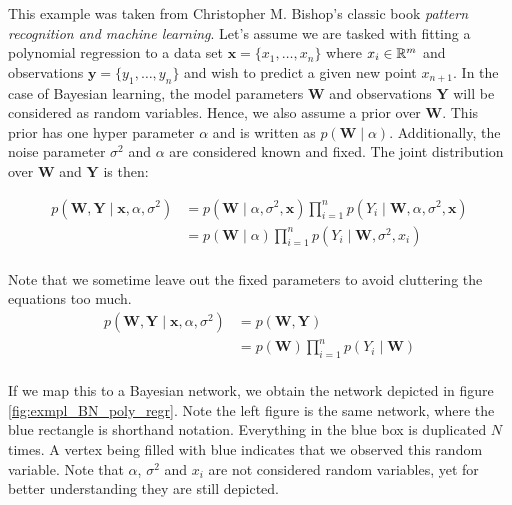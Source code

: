 \begin{exmp}
This example was taken from Christopher M. Bishop's classic book
\textit{pattern recognition and machine learning}. Let's assume
we are tasked with fitting a polynomial regression to a data set 
$\textbf{x} = \{x_1, \dots, x_n\}$ where $x_i \in \mathbb{R}^m$ and 
observations $\textbf{y}=\{y_1, \dots, y_n\}$ and wish to predict 
a given new point $x_{n+1}$.
In the case of Bayesian learning, the model parameters $\textbf{W}$
and observations $\textbf{Y}$ will be considered as random variables.
Hence, we also assume a prior over $\textbf{W}$. This prior has one
hyper parameter $\alpha$ and is written as $p(\textbf{W} \mid \alpha)$.
Additionally, the noise parameter $\sigma^2$ and $\alpha$ are
considered known and fixed. The joint distribution over $\textbf{W}$ 
and $\textbf{Y}$ is then:

\begin{equation}
\begin{split}
p(\textbf{W}, \textbf{Y} \mid \textbf{x}, \alpha, \sigma^2) 
	&= p(\textbf{W} \mid \alpha, \sigma^2, \textbf{x})
	   \prod_{i=1}^{n} p(Y_i \mid \textbf{W}, \alpha, \sigma^2, \textbf{x})\\
	&= p(\textbf{W} \mid \alpha)
	   \prod_{i=1}^{n} p(Y_i \mid \textbf{W}, \sigma^2, x_i)\\
\end{split}
\end{equation}

\noindent
Note that we sometime leave out the fixed parameters to avoid
cluttering the equations too much.
\begin{equation}
\begin{split}
p(\textbf{W}, \textbf{Y} \mid \textbf{x}, \alpha, \sigma^2) 
	&= p(\textbf{W}, \textbf{Y})\\
	&= p(\textbf{W})
	   \prod_{i=1}^{n} p(Y_i \mid \textbf{W})\\
\end{split}
\end{equation}

\noindent
If we map this to a Bayesian network, we obtain the network
depicted in figure \ref{fig:exmpl_BN_poly_regr}. Note the left
figure is the same network, where the blue rectangle is shorthand
notation. Everything in the blue box is duplicated $N$ times.
A vertex being filled with blue indicates that we observed this
random variable. Note that $\alpha$, $\sigma^2$ and $x_i$ 
are not considered random variables, yet for better understanding
they are still depicted.


\end{exmp}
